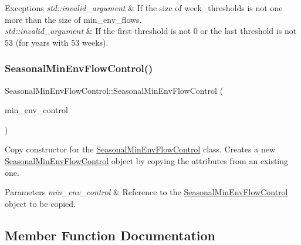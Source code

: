 \begin{DoxyExceptions}{Exceptions}
{\em std\+::invalid\+\_\+argument} & If the size of {\ttfamily week\+\_\+thresholds} is not one more than the size of {\ttfamily min\+\_\+env\+\_\+flows}. \\
\hline
{\em std\+::invalid\+\_\+argument} & If the first threshold is not 0 or the last threshold is not 53 (for years with 53 weeks). \\
\hline
\end{DoxyExceptions}
\mbox{\label{classSeasonalMinEnvFlowControl_ad0eeb570fc096a92b788b5c4a48bcec4}} 
\subsubsection{\texorpdfstring{Seasonal\+Min\+Env\+Flow\+Control()}{SeasonalMinEnvFlowControl()}\hspace{0.1cm}{\footnotesize\ttfamily [2/2]}}
{\footnotesize\ttfamily Seasonal\+Min\+Env\+Flow\+Control\+::\+Seasonal\+Min\+Env\+Flow\+Control (\begin{DoxyParamCaption}\item[{const \mbox{\hyperlink{classSeasonalMinEnvFlowControl}{Seasonal\+Min\+Env\+Flow\+Control}} \&}]{min\+\_\+env\+\_\+control }\end{DoxyParamCaption})}



Copy constructor for the {\ttfamily \mbox{\hyperlink{classSeasonalMinEnvFlowControl}{Seasonal\+Min\+Env\+Flow\+Control}}} class. Creates a new {\ttfamily \mbox{\hyperlink{classSeasonalMinEnvFlowControl}{Seasonal\+Min\+Env\+Flow\+Control}}} object by copying the attributes from an existing one. 


\begin{DoxyParams}{Parameters}
{\em min\+\_\+env\+\_\+control} & Reference to the {\ttfamily \mbox{\hyperlink{classSeasonalMinEnvFlowControl}{Seasonal\+Min\+Env\+Flow\+Control}}} object to be copied. \\
\hline
\end{DoxyParams}


\subsection{Member Function Documentation}
\mbox{\label{classSeasonalMinEnvFlowControl_a5c5ddcab367812bdd2e23b383449d202}} 
